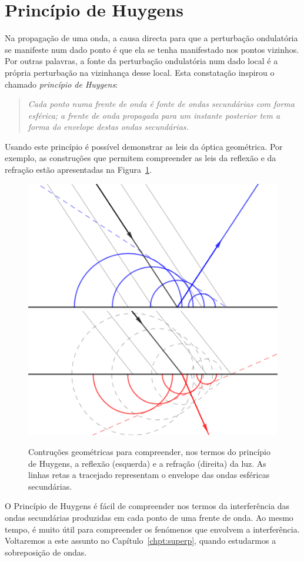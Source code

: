 \section{Princípio de Huygens}
Na propagação de uma onda, a causa directa para que a perturbação ondulatória se
manifeste num dado ponto é que ela se tenha manifestado nos pontos vizinhos. Por
outras palavras, a fonte da perturbação ondulatória num dado local é a própria
perturbação na vizinhança desse local. Esta constatação inspirou o chamado
\emph{princípio de Huygens}:
\begin{quote}
    \textsl{Cada ponto numa frente de onda é fonte de ondas secundárias com
    forma esférica; a frente de onda propagada para um instante posterior tem a
    forma do envelope destas ondas secundárias.}
\end{quote}
Usando este princípio é possível demonstrar as leis da óptica geométrica. Por
exemplo, as construções que permitem compreender as leis da reflexão e da
refração estão apresentadas na Figura~\ref{fig:f060}.
\begin{figure}[htb]
\begin{center}
\includegraphics[width=0.45\linewidth]{figs/huygens_reflection.png}\hfill
\includegraphics[width=0.45\linewidth]{figs/huygens_refraction.png}
\end{center}
\caption{Contruções geométricas para compreender, nos termos do princípio de
Huygens, a reflexão (esquerda) e a refração (direita) da luz. As linhas retas a
tracejado representam o envelope das ondas esféricas
secundárias.\label{fig:f060}}
\end{figure}

O Princípio de Huygens é fácil de compreender nos termos da interferência das
ondas secundárias produzidas em cada ponto de uma frente de onda. Ao mesmo
tempo, é muito útil para compreender os fenómenos que envolvem a interferência.
Voltaremos a este assunto no Capítulo~\ref{chpt:superp}, quando estudarmos a
sobreposição de ondas.


